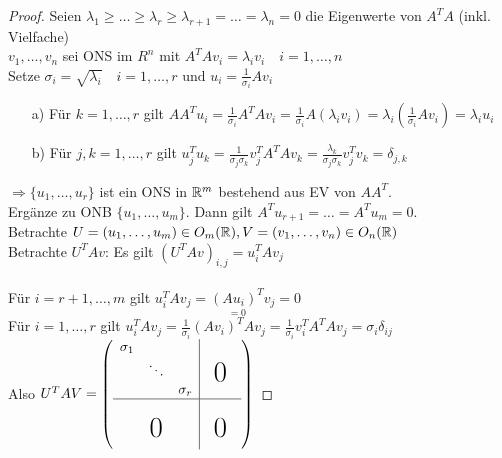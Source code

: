 \begin{proof}
	Seien $\lambda_1 \ge \ldots \ge \lambda_r\ge\lambda_{r+1}=\ldots=\lambda_n=0$ die Eigenwerte von $A^TA$ (inkl. Vielfache)\\
	$v_1,\ldots,v_n$ sei ONS im $R^n$ mit $A^TAv_i=\lambda_iv_i \quad i=1,\ldots,n$\\
	Setze $\sigma_i =\sqrt{\lambda_i} \quad i=1,\ldots,r \text{ und } u_i=\frac{1}{\sigma_i}Av_i$\\
	\begin{itemize}
		\item[a)]Für $k=1,\ldots,r$ gilt $AA^Tu_i=\frac{1}{\sigma_i}A^TAv_i=\frac{1}{\sigma_i}A(\lambda_iv_i)=\lambda_i\left(\frac{1}{\sigma_i}Av_i\right)=\lambda_iu_i$
		\item[b)]Für $j,k=1,\ldots,r$ gilt $u_j^{T}u_k=\frac{1}{\sigma_j\sigma_k}v_j^{T}A^TAv_k=\frac{\lambda_k}{\sigma_j\sigma_k}v_j^{T}v_k=\delta_{j,k}$
	\end{itemize}
	$\Rightarrow \{u_1,\ldots,u_r\}$ ist ein ONS in $\mathbb R^m$ bestehend aus EV von $AA^T$.\\\newline
	Ergänze zu ONB $\{u_1,\ldots,u_m\}$. Dann gilt $A^Tu_{r+1}=\ldots=A^Tu_m=0$.\\
	Betrachte $U=(u_1,\ldots,u_m) \in O_m(\mathbb R), V=(v_1,\ldots,v_n) \in O_n(\mathbb R)$\\
	Betrachte $U^TAv$: Es gilt $(U^TAv)_{i,j}=u_i^{T}Av_j$\\\\
	Für $i=r+1,\ldots,m$ gilt $u_i^{T}Av_j=\underset{=0}{(Au_i)^T}v_j=0$\\
	Für $i=1,\ldots,r $ gilt $u_i^{T}Av_j=\frac{1}{\sigma_i}(Av_i)^TAv_j=\frac{1}{\sigma_i}v_i^{T}A^TAv_j=\sigma_i\delta_{ij}$\\\newline
	Also $U^TAV= \left(\begin{array}{c|c}
		\begin{matrix}\sigma_1 & &  \\&\ddots & \\ & & \sigma_r\end{matrix} &\begin{matrix}& &\\ &\bigzero& \\&&\end{matrix}\\\hline
		\bigzero &\begin{matrix}& &\\ &\bigzero& \\&&\end{matrix}
		\end{array}\right)$
\end{proof}